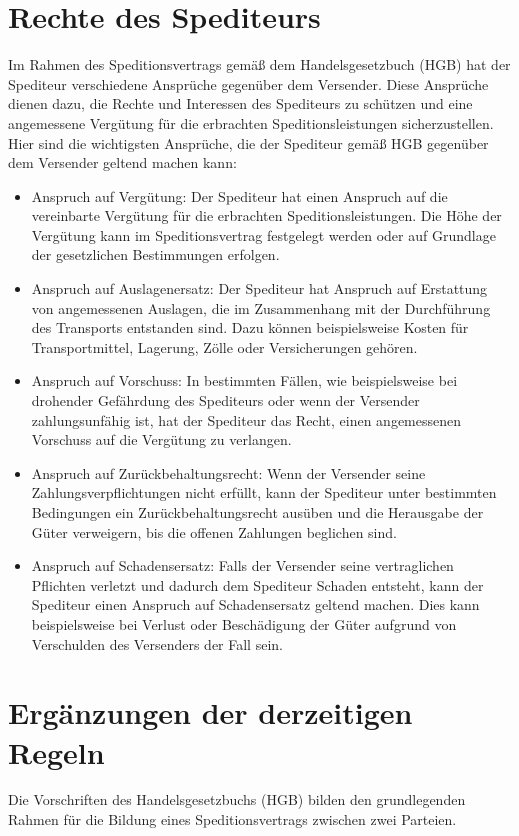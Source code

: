 \section{Rechte des Spediteurs}
Im Rahmen des Speditionsvertrags gemäß dem Handelsgesetzbuch (HGB) hat der Spediteur verschiedene Ansprüche gegenüber dem Versender. Diese Ansprüche dienen dazu, die Rechte und Interessen des Spediteurs zu schützen und eine angemessene Vergütung für die erbrachten Speditionsleistungen sicherzustellen. Hier sind die wichtigsten Ansprüche, die der Spediteur gemäß HGB gegenüber dem Versender geltend machen kann:
\begin{itemize}
    \item Anspruch auf Vergütung: Der Spediteur hat einen Anspruch auf die vereinbarte Vergütung für die erbrachten Speditionsleistungen. Die Höhe der Vergütung kann im Speditionsvertrag festgelegt werden oder auf Grundlage der gesetzlichen Bestimmungen erfolgen.
    \item Anspruch auf Auslagenersatz: Der Spediteur hat Anspruch auf Erstattung von angemessenen Auslagen, die im Zusammenhang mit der Durchführung des Transports entstanden sind. Dazu können beispielsweise Kosten für Transportmittel, Lagerung, Zölle oder Versicherungen gehören.
    \item Anspruch auf Vorschuss: In bestimmten Fällen, wie beispielsweise bei drohender Gefährdung des Spediteurs oder wenn der Versender zahlungsunfähig ist, hat der Spediteur das Recht, einen angemessenen Vorschuss auf die Vergütung zu verlangen.
    \item Anspruch auf Zurückbehaltungsrecht: Wenn der Versender seine Zahlungsverpflichtungen nicht erfüllt, kann der Spediteur unter bestimmten Bedingungen ein Zurückbehaltungsrecht ausüben und die Herausgabe der Güter verweigern, bis die offenen Zahlungen beglichen sind.
    \item Anspruch auf Schadensersatz: Falls der Versender seine vertraglichen Pflichten verletzt und dadurch dem Spediteur Schaden entsteht, kann der Spediteur einen Anspruch auf Schadensersatz geltend machen. Dies kann beispielsweise bei Verlust oder Beschädigung der Güter aufgrund von Verschulden des Versenders der Fall sein.
\end{itemize}

\section{Ergänzungen der derzeitigen Regeln}
Die Vorschriften des Handelsgesetzbuchs (HGB) bilden den grundlegenden Rahmen für die Bildung eines Speditionsvertrags zwischen zwei Parteien.

